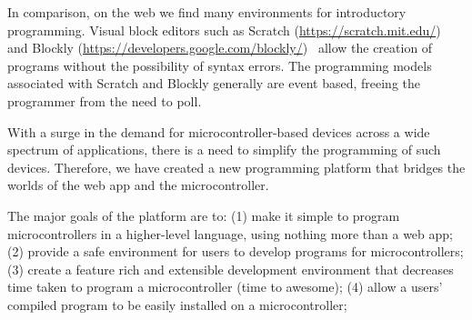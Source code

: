 
In comparison, on the web we find many environments for introductory programming.
Visual block editors such as Scratch (\url{https://scratch.mit.edu/})~\cite{ScratchCACM2009,BlocksBeyondCACM2017}
and Blockly (\url{https://developers.google.com/blockly/})~\cite{Blocky2015}
allow the creation of programs without the possibility of syntax errors.
The programming models associated with Scratch and Blockly generally are
event based, freeing the programmer from the need to poll.


With a surge in the demand for microcontroller-based devices across a wide
spectrum of applications, 
there is a need to simplify the programming of such devices.
Therefore, we have created a new programming platform that bridges the worlds of
the web app and the microcontroller. 

The major goals of the platform are to:
(1) make it simple to program microcontrollers in a higher-level language,
using nothing more than a web app;
(2) provide a safe environment for users to develop programs for microcontrollers;
(3) create a feature rich and extensible development environment that decreases time taken to program a microcontroller (time to awesome);
(4) allow a users' compiled program to be easily installed on a microcontroller;


